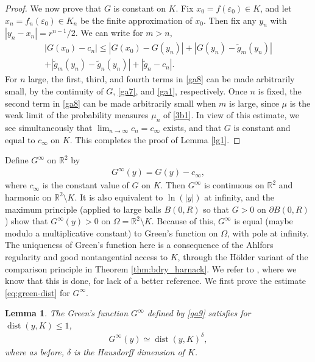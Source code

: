 \documentclass[10pt]{amsart}
\let\sm\setminus
\numberwithin{equation}{section}
\theoremstyle{plain}
\newtheorem{lem}{Lemma}[section]
\theoremstyle{definition}
\newcommand{\R}{\mathbb{R}}
\renewcommand{\d}{\partial}
\DeclareMathOperator{\dist}{dist}
\begin{document}
\begin{proof}
We now prove that $G$ is constant on $K$.
Fix $x_0 \!=\! f (\varepsilon_0) \!\in\! K$, and let \hbox{$x_n \!=\! f_n(\varepsilon_0) \!\in\! K_n$} be the finite
approximation of $x_0$.
Then fix any $y_n$ with $|y_n - x_n| = r^{n-1}/2$. We can write for $m > n$,
\begin{multline}\label{ga8}
	\left| G(x_0) - c_n \right| \le |G(x_0) - G(y_n)| + |G(y_n) - \tilde{g}_m(y_n)| \\
	 + | \tilde{g}_m(y_n) - \tilde{g}_n(y_n) | + | \tilde{g}_n - c_n|.
\end{multline}
For $n$ large, the first, third, and fourth terms in \eqref{ga8} can be made arbitrarily small, by the continuity of $G$, \eqref{ga7}, and \eqref{ga1}, respectively. Once $n$ is fixed, the second term in \eqref{ga8} can be made arbitrarily small when $m$
is large, since $\mu$ is the weak limit of the probability measures $\mu_n$ of \eqref{3b1}.
	In view of this estimate, we see simultaneously that $\lim_{n \to \infty} c_n = c_\infty$ exists, and that $G$ is constant and equal to $c_\infty$ on $K$. This completes the proof of Lemma \ref{lg1}.
	\end{proof}

Define $G^\infty$ on $\R^2$ by
\begin{align} \label{ga9}
G^\infty(y) = G(y) - c_\infty,
\end{align}
where $c_\infty$ is the constant value of $G$ on $K$.
Then $G^\infty$ is continuous on $\R^2$ and harmonic on $\R^2 \sm K$. It is also equivalent
to $\ln(|y|)$ at infinity, and the maximum principle (applied to large balls $B(0,R)$ so that $G > 0$ on
$\d B(0,R)$) show that $G^\infty(y) > 0$ on $\Omega = \R^2 \sm K$. Because of this, $G^\infty$ is equal
(maybe modulo a multiplicative constant) to Green's function on $\Omega$, with pole at infinity.
The uniqueness of Green's function here is a consequence of the Ahlfors regularity and good nontangential
access to $K$, through the Hölder variant of the comparison principle in Theorem \ref{thm:bdry_harnack}.
We refer to \cite{DEM21}, where we know that this is done, for lack of a better reference.
We first prove the estimate \eqref{eq:green-dist} for $G^\infty$.

\begin{lem}\label{lem:greeninfinity}
The Green's function $G^\infty$ defined by \eqref{ga9} satisfies for $\dist(y, K) \le 1$,
\begin{align} \label{ga10}
G^\infty(y) \simeq \dist(y, K)^\delta,
\end{align}
where as before, $\delta$ is the Hausdorff dimension of $K$.
\end{lem}
\end{document}
